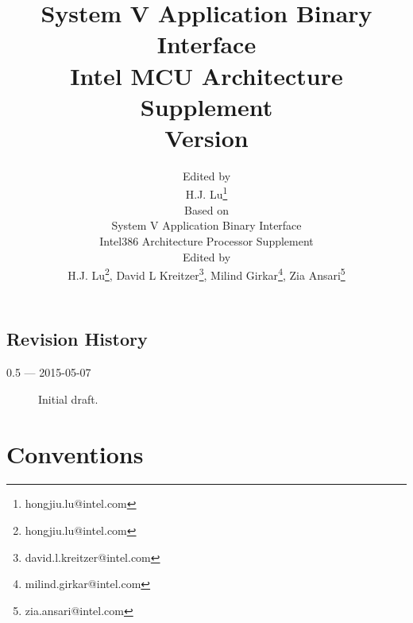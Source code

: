 \documentclass[12pt]{report}
\begin{document}
\author{Edited by\\
  H.J. Lu\thanks{hongjiu.lu@intel.com} \\
  \small
  Based on\\
  \small
  System V Application Binary Interface\\
  \small
  Intel386 Architecture Processor Supplement\\
  \small
  Edited by\\
  \small
  H.J. Lu\thanks{hongjiu.lu@intel.com},
  David L Kreitzer\thanks{david.l.kreitzer@intel.com},
  Milind Girkar\thanks{milind.girkar@intel.com},
  Zia Ansari\thanks{zia.ansari@intel.com}}

\title{System V Application Binary Interface\\
{\Large Intel MCU Architecture Supplement\\
Version \version}}
\maketitle
\tableofcontents
\listoftables
\listoffigures

\section*{Revision History}

\begin{description}

\item[0.5 --- 2015-05-07] Initial draft.
\end{description}







\chapter{Conventions}


\appendix

\end{document}
